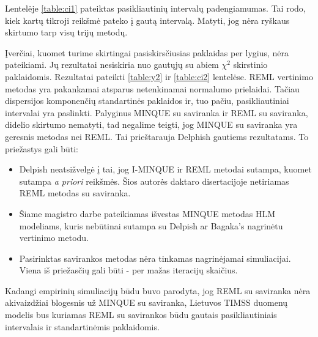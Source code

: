 \documentclass[12pt,a4paper]{article}
\begin{document}
\indent Lentelėje \ref{table:ci1} pateiktas pasikliautinių intervalų padengiamumas. Tai rodo, kiek kartų tikroji reikšmė pateko į gautą intervalą. Matyti, jog nėra ryškaus skirtumo tarp visų trijų metodų.

\indent Įverčiai, kuomet turime skirtingai pasiskirsčiusias paklaidas per lygius, nėra pateikiami. Jų rezultatai nesiskiria nuo gautųjų su abiem $\chi^2$ skirstinio paklaidomis. Rezultatai pateikti \ref{table:y2} ir \ref{table:ci2} lentelėse. REML vertinimo metodas yra pakankamai atsparus netenkinamai normalumo prielaidai. Tačiau dispersijos komponenčių standartinės paklaidos ir, tuo pačiu, pasikliautiniai intervalai yra paslinkti. Palyginus MINQUE su saviranka ir REML su saviranka, didelio skirtumo nematyti, tad negalime teigti, jog MINQUE su saviranka yra geresnis metodas nei REML. Tai prieštarauja Delphish gautiems rezultatams. To priežastys gali būti:
\begin{itemize}
\item Delpish neatsižvelgė į tai, jog I-MINQUE ir REML metodai sutampa, kuomet sutampa \textit{a priori} reikšmės. Šios autorės daktaro disertacijoje netiriamas REML metodas su saviranka.
\item Šiame magistro darbe pateikiamas išvestas MINQUE metodas HLM modeliams, kuris nebūtinai sutampa su Delpish ar Bagaka's nagrinėtu vertinimo metodu.
\item Pasirinktas savirankos metodas nėra tinkamas nagrinėjamai simuliacijai. Viena iš priežasčių gali būti - per mažas iteracijų skaičius.
\end{itemize}

\indent Kadangi empirinių simuliacijų būdu buvo parodyta, jog REML su saviranka nėra akivaizdžiai blogesnis už MINQUE su saviranka, Lietuvos TIMSS duomenų modelis bus kuriamas REML su savirankos būdu gautais pasikliautiniais intervalais ir standartinėmis paklaidomis.
\end{document}
